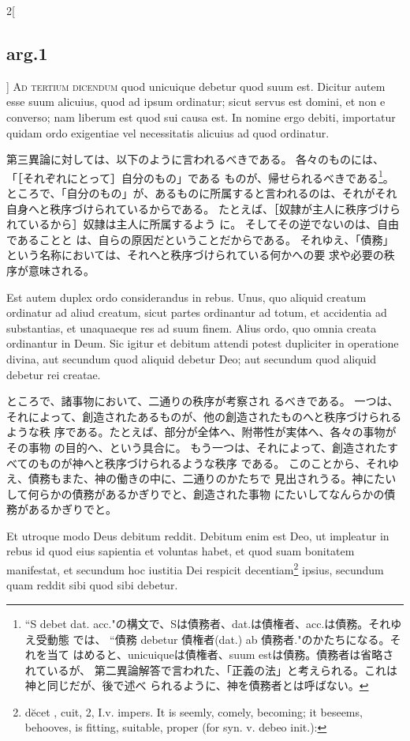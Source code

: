 \documentclass[paper=a4paper,fontsize=10pt,jafontsize=9pt,titlepage]{jlreq}
\begin{document}
\begin{paracol}{2}[\subsection{arg.1}]
{\scshape Ad tertium dicendum} quod unicuique debetur
quod suum est. Dicitur autem esse suum alicuius, quod ad ipsum
ordinatur; sicut servus est domini, et non e converso; nam liberum est
quod sui causa est. In nomine ergo debiti, importatur quidam ordo
exigentiae vel necessitatis alicuius ad quod ordinatur.

\switchcolumn

第三異論に対しては、以下のように言われるべきである。
各々のものには、「［それぞれにとって］自分のもの」である
 ものが、帰せられるべきである\footnote{ ``S debet
 dat. acc."の構文で、Sは債務者、dat.は債権者、acc.は債務。それゆえ受動態
 では、 ``債務 debetur 債権者(dat.) ab 債務者."のかたちになる。それを当て
 はめると、unicuiqueは債権者、suum estは債務。債務者は省略されているが、
 第二異論解答で言われた、「正義の法」と考えられる。これは神と同じだが、後で述べ
 られるように、神を債務者とは呼ばない。}。
ところで、「自分のもの」が、あるものに所属すると言われるのは、それがそれ
 自身へと秩序づけられているからである。
たとえば、［奴隷が主人に秩序づけられているから］奴隷は主人に所属するよう
 に。
そしてその逆でないのは、自由であることと
は、自らの原因だということだからである。
それゆえ、「債務」という名称においては、それへと秩序づけられている何かへの要
求や必要の秩序が意味される。

\switchcolumn*

Est autem duplex
ordo considerandus in rebus. 
Unus, quo aliquid creatum ordinatur ad
aliud creatum, sicut partes ordinantur ad totum, et accidentia ad
substantias, et unaquaeque res ad suum finem. Alius ordo, quo omnia
creata ordinantur in Deum. Sic igitur et debitum attendi potest
dupliciter in operatione divina, aut secundum quod aliquid debetur Deo;
aut secundum quod aliquid debetur rei creatae.

\switchcolumn

ところで、諸事物において、二通りの秩序が考察され
るべきである。
一つは、それによって、創造されたあるものが、他の創造されたものへと秩序づけられるような秩
 序である。たとえば、部分が全体へ、附帯性が実体へ、各々の事物がその事物
 の目的へ、という具合に。
もう一つは、それによって、創造されたすべてのものが神へと秩序づけられるような秩序
 である。
このことから、それゆえ、債務もまた、神の働きの中に、二通りのかたちで
 見出されうる。神にたいして何らかの債務があるかぎりでと、創造された事物
 にたいしてなんらかの債務があるかぎりでと。

\switchcolumn*

Et utroque modo Deus
debitum reddit. Debitum enim est Deo, ut impleatur in rebus id quod eius
sapientia et voluntas habet, et quod suam bonitatem manifestat, et
secundum hoc iustitia Dei respicit decentiam\footnote{d\u{e}cet , cuit, 2,
I.v. impers. It is seemly, comely, becoming; it beseems, behooves, is fitting, suitable, proper (for syn. v. debeo init.):} ipsius, secundum quam
reddit sibi quod sibi debetur.


\end{paracol}
\end{document}
